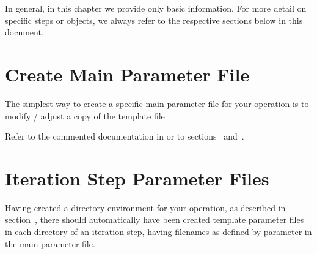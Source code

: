
%
%
%

In general, in this chapter we provide only basic information. For more detail on 
specific steps or objects, we always refer to the respective sections below in this document.
%
\section{Create Main Parameter File} \label{basic_steps,sec:main_parfile}
%
The simplest way to create a specific main parameter file for your operation is to modify / adjust 
a copy of the template file . 

Refer to the commented documentation in  or 
to sections~ and~.
%
\section{Iteration Step Parameter Files} \label{basic_steps,sec:iter_parfile}
%
Having created a directory environment for your operation, as described in section~,
there should automatically have been created template
parameter files in each directory of an iteration step, having filenames as defined by
parameter  in the main parameter file.

